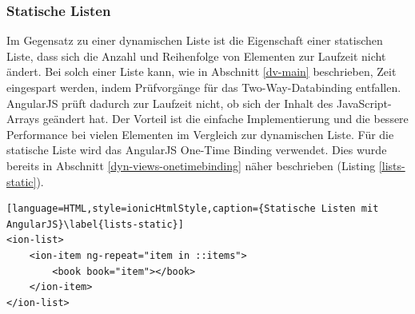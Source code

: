\subsubsection{Statische Listen}
Im Gegensatz zu einer dynamischen Liste ist die Eigenschaft einer statischen Liste, dass sich die Anzahl und Reihenfolge von Elementen zur Laufzeit nicht ändert. Bei solch einer Liste kann, wie in Abschnitt \ref{dv-main} beschrieben, Zeit eingespart werden, indem Prüfvorgänge für das Two-Way-Databinding entfallen. AngularJS prüft dadurch zur Laufzeit nicht, ob sich der Inhalt des JavaScript-Arrays geändert hat. Der Vorteil ist die einfache Implementierung und die bessere Performance bei vielen Elementen im Vergleich zur dynamischen Liste. Für die statische Liste wird das AngularJS One-Time Binding verwendet. Dies wurde bereits in Abschnitt \ref{dyn-views-onetimebinding} näher beschrieben (Listing \ref{lists-static}).\cite{AJSOneTimeBinding}
\begin{lstlisting}[language=HTML,style=ionicHtmlStyle,caption={Statische Listen mit AngularJS}\label{lists-static}]
<ion-list>
	<ion-item ng-repeat="item in ::items">
		<book book="item"></book>
	</ion-item>
</ion-list>
\end{lstlisting}

